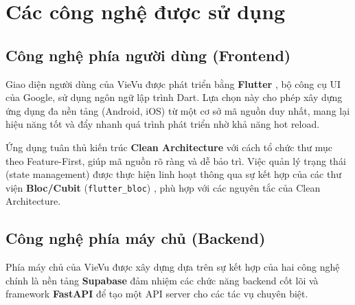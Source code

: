 \section{Các công nghệ được sử dụng}
\subsection{Công nghệ phía người dùng (Frontend)}
\label{subsec:frontend_tech}

Giao diện người dùng của VieVu được phát triển bằng \textbf{Flutter} \cite{flutter_doc}, bộ công cụ UI của Google, sử dụng ngôn ngữ lập trình Dart. Lựa chọn này cho phép xây dựng ứng dụng đa nền tảng (Android, iOS) từ một cơ sở mã nguồn duy nhất, mang lại hiệu năng tốt và đẩy nhanh quá trình phát triển nhờ khả năng hot reload.

Ứng dụng tuân thủ kiến trúc \textbf{Clean Architecture} \cite{clean_arch} với cách tổ chức thư mục theo Feature-First, giúp mã nguồn rõ ràng và dễ bảo trì. Việc quản lý trạng thái (state management) được thực hiện linh hoạt thông qua sự kết hợp của các thư viện \textbf{Bloc/Cubit} (\texttt{flutter\_bloc}) \cite{bloc_package}, phù hợp với các nguyên tắc của Clean Architecture.

\subsection{Công nghệ phía máy chủ (Backend)}
\label{subsec:backend_tech}

Phía máy chủ của VieVu được xây dựng dựa trên sự kết hợp của hai công nghệ chính là nền tảng \textbf{Supabase} đảm nhiệm các chức năng backend cốt lõi và framework \textbf{FastAPI} để tạo một API server cho các tác vụ chuyên biệt.

